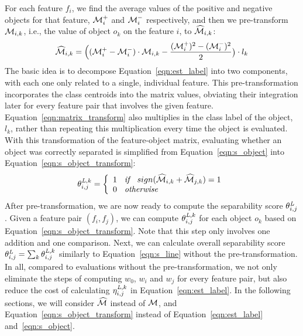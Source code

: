  For each feature $f_i$, we find the average values of the positive and negative objects for that feature, $\mm_i^+$ and $\mm_i^-$ respectively, and then we pre-transform $\mm_{i,k}$, i.e., the value of object $o_k$ on the feature $i$, to $\widehat{\mm}_{i,k}$:
\begin{equation}\label{eqn:matrix_transform}
\widehat{\mm}_{i,k} = \Big( (\mm_i^+-\mm_i^-)\cdot \mm_{i,k}-\frac{(\mm_i^+)^2-(\mm_i^-)^2}{2} \Big) \cdot l_k
\end{equation}
\noindent The basic idea is to decompose Equation~\ref{eqn:est_label} into two components, with each one only related to a single, individual feature. This pre-transformation incorporates the class centroids into the matrix values, obviating their integration later for every feature pair that involves the given feature. Equation~\ref{eqn:matrix_transform} also multiplies in the class label of the object, $l_k$, rather than repeating this multiplication every time the object is evaluated. With this transformation of the feature-object matrix, evaluating whether an object was correctly separated is simplified from Equation~\ref{eqn:s_object} into Equation~\ref{eqn:s_object_transform}:
\begin{equation}\label{eqn:s_object_transform}
\theta_{i,j}^{\lhat,k}=\left\{
  \begin{array}{ll}
   1 \textit{\hspace{2mm} if \hspace{2mm}} sign(\widehat{\mm}_{i,k} + \widehat{\mm}_{j,k}) = 1\\
   0 \textit{\hspace{2mm} otherwise \hspace{2mm}}
  \end{array}
  \right.
\end{equation}
After pre-transformation, we are now ready to compute the separability score $\theta_{i,j}^{\mathit{L}}$. Given a feature pair $(f_i,f_j)$, we can compute $\theta_{i,j}^{\mathit{L},k}$ for each object $o_k$ based on Equation~\ref{eqn:s_object_transform}. Note that this step only involves one addition and one comparison. Next, we can calculate overall separability score $\theta_{i,j}^{\mathit{L}} = \sum_{k}{\theta_{i,j}^{\mathit{L},k}}$ similarly to Equation~\ref{eqn:s_line} without the pre-transformation. In all, compared to evaluations without the pre-transformation, we not only eliminate the steps of computing $w_0$, $w_i$ and $w_j$ for every feature pair, but also reduce the cost of calculating $\eta_{i,j}^{\mathit{L},k}$ in Equation~\ref{eqn:est_label}. In the following sections, we will consider $\widehat{\mm}$ instead of $\mm$, and Equation~\ref{eqn:s_object_transform} instead of Equation~\ref{eqn:est_label} and~\ref{eqn:s_object}.

